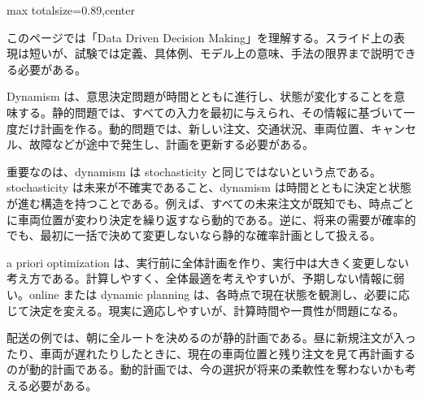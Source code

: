 \begin{minipage}[t]{0.58\textwidth}
\begin{adjustbox}{max totalsize={\textwidth}{0.89\textheight},center}
\begin{minipage}{\textwidth}\scriptsize
{}このページでは「Data Driven Decision Making」を理解する。スライド上の表現は短いが、試験では定義、具体例、モデル上の意味、手法の限界まで説明できる必要がある。\par
Dynamism は、意思決定問題が時間とともに進行し、状態が変化することを意味する。静的問題では、すべての入力を最初に与えられ、その情報に基づいて一度だけ計画を作る。動的問題では、新しい注文、交通状況、車両位置、キャンセル、故障などが途中で発生し、計画を更新する必要がある。\par
重要なのは、dynamism は stochasticity と同じではないという点である。stochasticity は未来が不確実であること、dynamism は時間とともに決定と状態が進む構造を持つことである。例えば、すべての未来注文が既知でも、時点ごとに車両位置が変わり決定を繰り返すなら動的である。逆に、将来の需要が確率的でも、最初に一括で決めて変更しないなら静的な確率計画として扱える。\par
a priori optimization は、実行前に全体計画を作り、実行中は大きく変更しない考え方である。計算しやすく、全体最適を考えやすいが、予期しない情報に弱い。online または dynamic planning は、各時点で現在状態を観測し、必要に応じて決定を変える。現実に適応しやすいが、計算時間や一貫性が問題になる。\par
配送の例では、朝に全ルートを決めるのが静的計画である。昼に新規注文が入ったり、車両が遅れたりしたときに、現在の車両位置と残り注文を見て再計画するのが動的計画である。動的計画では、今の選択が将来の柔軟性を奪わないかも考える必要がある。\par

\end{minipage}
\end{adjustbox}
\end{minipage}
